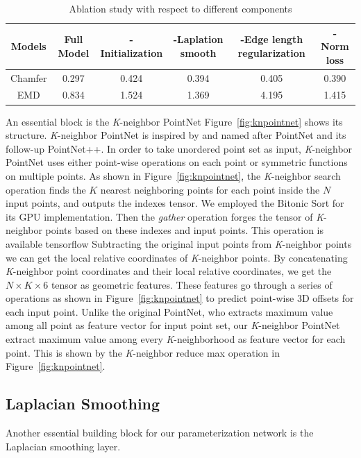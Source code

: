 \begin{table}
	\caption{Ablation study with respect to different components}
	\label{tab:ablation}
	\centering
	\begin{tabular}{c | c c c c c}
		Models &  Full Model  & -Initialization & -Laplation smooth & -Edge length regularization & -Norm loss \\
		\hline
		Chamfer      & 0.297 & 0.424 & 0.394 & 0.405  & 0.390\\
		EMD			 & 0.834 & 1.524 & 1.369 & 4.195  & 1.415
	\end{tabular}
\end{table}

An essential block is the \textit{K}-neighbor PointNet 
%
Figure~\ref{fig:knpointnet} shows its structure. 
\textit{K}-neighbor PointNet is inspired by and named after PointNet\cite{PointNet} and its follow-up PointNet++\cite{NIPS2017_7095}. 
%
In order to take unordered point set as input, \textit{K}-neighbor PointNet uses either point-wise operations on each point or symmetric functions on multiple points. 
As shown in Figure~\ref{fig:knpointnet}, the \textit{K}-neighbor search operation finds the $K$ nearest neighboring points for each point inside the $N$ input points, and outputs the indexes tensor. 
We employed the Bitonic Sort\cite{bitonicsorter} for its GPU implementation. 
Then the \emph{gather} operation forges the tensor of \textit{K}-neighbor points based on these indexes and input points. 
%
This operation is available tensorflow 
Subtracting the original input points from \textit{K}-neighbor points we can get the local relative coordinates of \textit{K}-neighbor points. 
By concatenating \textit{K}-neighbor point coordinates and their local relative coordinates, we get the $N\times K\times6$ tensor as geometric features. 
%
These features go through a series of operations as shown in Figure~\ref{fig:knpointnet} to predict point-wise 3D offsets for each input point. Unlike the original PointNet\cite{PointNet}, who extracts maximum value among all point as feature vector for input point set, our \textit{K}-neighbor PointNet extract maximum value among every \textit{K}-neighborhood as feature vector for each point. This is shown by the \textit{K}-neighbor reduce max operation in Figure~\ref{fig:knpointnet}.

 
\subsection{Laplacian Smoothing}
Another essential building block for our parameterization network is the Laplacian smoothing layer. 
%

